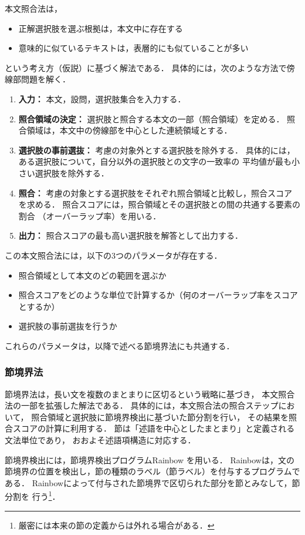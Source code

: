\documentclass[japanese]{jnlp_1.4b}
\begin{document}
本文照合法は，
\begin{itemize}
\item 正解選択肢を選ぶ根拠は，本文中に存在する\cite{Funaguchi,Itano}
\item 意味的に似ているテキストは，表層的にも似ていることが多い
\end{itemize}
という考え方（仮説）に基づく解法である．
具体的には，次のような方法で傍線部問題を解く．
\begin{enumerate}
\item {\bf 入力：} 本文，設問，選択肢集合を入力する．
\item {\bf 照合領域の決定：} 選択肢と照合する本文の一部（照合領域）を定める．
  照合領域は，本文中の傍線部を中心とした連続領域とする．
\item {\bf 選択肢の事前選抜：} 考慮の対象外とする選択肢を除外する．
  具体的には，ある選択肢について，自分以外の選択肢との文字の一致率の
  平均値が最も小さい選択肢を除外する．
\item {\bf 照合：} 考慮の対象とする選択肢をそれぞれ照合領域と比較し，照合スコアを求める．
  照合スコアには，照合領域とその選択肢との間の共通する要素の割合
  （オーバーラップ率\cite{Hattori2013}）を用いる．
\item {\bf 出力：} 照合スコアの最も高い選択肢を解答として出力する．
\end{enumerate}

この本文照合法には，以下の3つのパラメータが存在する．
\begin{itemize}
\item 照合領域として本文のどの範囲を選ぶか
\item 照合スコアをどのような単位で計算するか（何のオーバーラップ率をスコアとするか）
\item 選択肢の事前選抜を行うか
\end{itemize}
これらのパラメータは，以降で述べる節境界法にも共通する．


\subsubsection{節境界法}

節境界法は，長い文を複数のまとまりに区切るという戦略に基づき，
本文照合法の一部を拡張した解法である．
具体的には，本文照合法の照合ステップにおいて，
照合領域と選択肢に節境界検出に基づいた節分割を行い，
その結果を照合スコアの計算に利用する．
節は「述語を中心としたまとまり」\cite{KisoNihongo}と定義される文法単位であり，
おおよそ述語項構造に対応する．

節境界検出には，節境界検出プログラムRainbow \cite{Rainbow}を用いる．
Rainbowは，文の節境界の位置を検出し，節の種類のラベル（節ラベル）を付与するプログラムである．
Rainbowによって付与された節境界で区切られた部分を節とみなして，節分割を
行う\footnote{厳密には本来の節の定義からは外れる場合がある．}．
\end{document}
